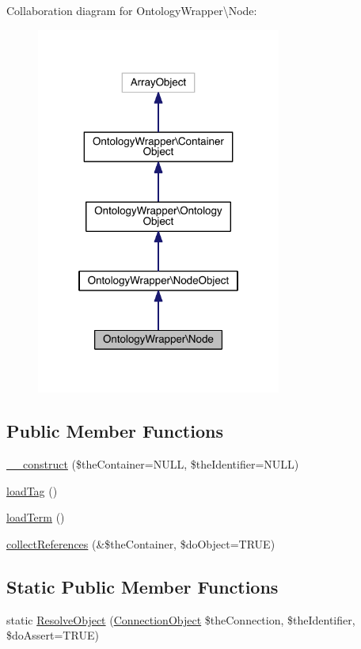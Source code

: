 Collaboration diagram for Ontology\-Wrapper\textbackslash{}Node\-:
\nopagebreak
\begin{figure}[H]
\begin{center}
\leavevmode
\includegraphics[width=228pt]{class_ontology_wrapper_1_1_node__coll__graph}
\end{center}
\end{figure}
\subsection*{Public Member Functions}
\begin{DoxyCompactItemize}
\item 
\hyperlink{class_ontology_wrapper_1_1_node_aa17f2c63c36277160e883deeb0b96134}{\-\_\-\-\_\-construct} (\$the\-Container=N\-U\-L\-L, \$the\-Identifier=N\-U\-L\-L)
\item 
\hyperlink{class_ontology_wrapper_1_1_node_ab1a39673329171326b6595d0c4cb782a}{load\-Tag} ()
\item 
\hyperlink{class_ontology_wrapper_1_1_node_a672ee5306bf9cb8c8c200f51a72e23e3}{load\-Term} ()
\item 
\hyperlink{class_ontology_wrapper_1_1_node_a01c318740fadbbb79d21513495e2b16a}{collect\-References} (\&\$the\-Container, \$do\-Object=T\-R\-U\-E)
\end{DoxyCompactItemize}
\subsection*{Static Public Member Functions}
\begin{DoxyCompactItemize}
\item 
static \hyperlink{class_ontology_wrapper_1_1_node_acd916b0222274569525e2a150a71b7dc}{Resolve\-Object} (\hyperlink{class_ontology_wrapper_1_1_connection_object}{Connection\-Object} \$the\-Connection, \$the\-Identifier, \$do\-Assert=T\-R\-U\-E)
\end{DoxyCompactItemize}
